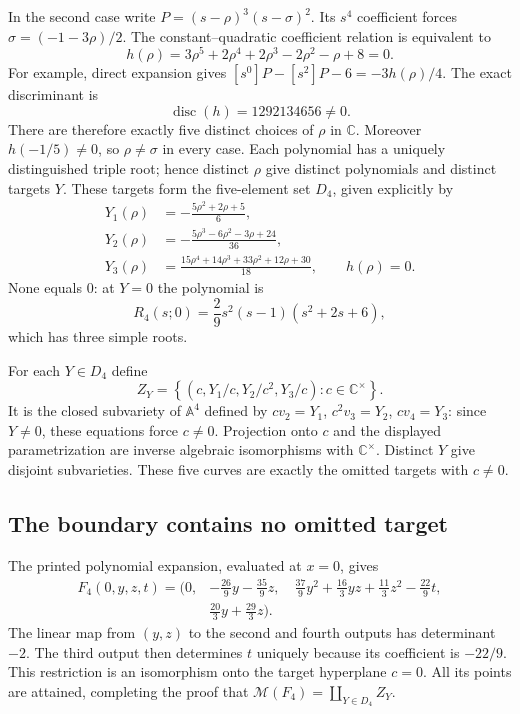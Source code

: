 \documentclass[11pt]{article}
\numberwithin{equation}{section}
\theoremstyle{plain}
\theoremstyle{definition}
\theoremstyle{remark}
\newcommand{\C}{\mathbb{C}}
\newcommand{\A}{\mathbb{A}}
\newcommand{\Miss}{\mathcal M}
\begin{document}
In the second case write $P=(s-\rho)^3(s-\sigma)^2$. Its $s^4$ coefficient
forces $\sigma=(-1-3\rho)/2$. The constant--quadratic coefficient relation is
equivalent to
\begin{equation}\label{prod:eq:h}
 h(\rho)=3\rho^5+2\rho^4+2\rho^3-2\rho^2-\rho+8=0.
\end{equation}
For example, direct expansion gives
$[s^0]P-[s^2]P-6=-3h(\rho)/4$.
The exact discriminant is
\[
 \operatorname{disc}(h)=1292134656\ne0.
\]
There are therefore exactly five distinct choices of $\rho$ in $\C$.
Moreover $h(-1/5)\ne0$, so $\rho\ne\sigma$ in every case.
Each polynomial has a uniquely distinguished triple root; hence distinct
$\rho$ give distinct polynomials and distinct targets $Y$.
These targets form the five-element set $D_4$, given explicitly by
\begin{align*}
 Y_1(\rho)&=-\frac{5\rho^2+2\rho+5}{6},\\
 Y_2(\rho)&=-\frac{5\rho^3-6\rho^2-3\rho+24}{36},\\
 Y_3(\rho)&=\frac{15\rho^4+14\rho^3+33\rho^2+12\rho+30}{18},
 \qquad h(\rho)=0.
\end{align*}
None equals $0$: at $Y=0$ the polynomial is
\[
 R_4(s;0)=\frac29s^2(s-1)(s^2+2s+6),
\]
which has three simple roots.

For each $Y\in D_4$ define
\[
 Z_Y=\left\{(c,Y_1/c,Y_2/c^2,Y_3/c):c\in\C^\times\right\}.
\]
It is the closed subvariety of $\A^4$ defined by
$cv_2=Y_1$, $c^2v_3=Y_2$, $cv_4=Y_3$: since $Y\ne0$, these equations
force $c\ne0$. Projection onto $c$ and the displayed parametrization
are inverse algebraic isomorphisms with $\C^\times$. Distinct $Y$ give
disjoint subvarieties. These five curves are exactly the omitted targets
with $c\ne0$.

\subsection{The boundary contains no omitted target}
The printed polynomial expansion, evaluated at $x=0$, gives
\begin{align*}
 F_4(0,y,z,t)=\biggl(0,&-\frac{26}{9}y-\frac{35}{9}z,\quad
 \frac{37}{9}y^2+\frac{16}{3}yz+\frac{11}{3}z^2-\frac{22}{9}t,\\
 &\frac{20}{3}y+\frac{29}{3}z\biggr).
\end{align*}
The linear map from $(y,z)$ to the second and fourth outputs has
determinant $-2$. The third output then determines $t$ uniquely because
its coefficient is $-22/9$. This restriction is an isomorphism onto the
target hyperplane $c=0$. All its points are attained, completing the proof
that $\Miss(F_4)=\coprod_{Y\in D_4}Z_Y$.
\end{document}
